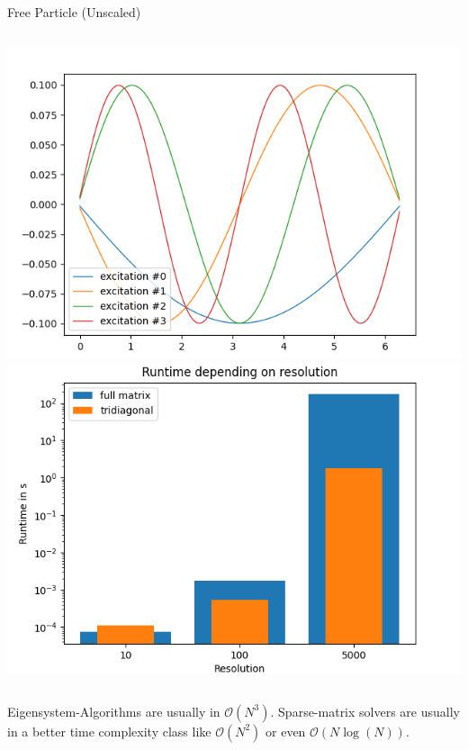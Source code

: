 \begin{frame}{Free Particle (Unscaled)}
%
\begin{columns}
\includegraphics[width=\linewidth]{./gfx/07-free-particle-success}
%
\includegraphics[width=\linewidth]{./gfx/07-free-particle-runtime}
\end{columns}
%
\begin{hintbox}
\footnotesize
Eigensystem-Algorithms are usually in $\mathcal{O}(N^3)$. Sparse-matrix solvers are usually in a better time complexity class like $\mathcal{O}(N^2)$ or even $\mathcal{O}(N \log(N))$.
\end{hintbox}
%
\end{frame}


